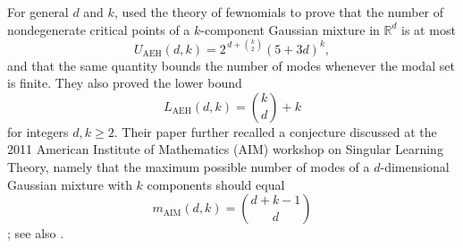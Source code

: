 \documentclass[11pt]{article}
\theoremstyle{plain}
\theoremstyle{definition}
\theoremstyle{remark}
\numberwithin{equation}{section}
\newcommand{\R}{\mathbb{R}}
\begin{document}
For general $d$ and $k$, \citet{AmendolaEngstromHaase2019} used the theory of fewnomials \citep{Khovanskii1991} to prove that the number of nondegenerate critical points of a $k$-component Gaussian mixture in $\R^d$ is at most
\[
U_{\mathrm{AEH}}(d,k)=2^{\,d+\binom{k}{2}}(5+3d)^k,
\]
and that the same quantity bounds the number of modes whenever the modal set is finite. They also proved the lower bound
\[
L_{\mathrm{AEH}}(d,k)=\binom{k}{d}+k
\]
for integers $d,k\ge 2$. Their paper further recalled a conjecture discussed at the 2011 American Institute of Mathematics (AIM) workshop on Singular Learning Theory, namely that the maximum possible number of modes of a $d$-dimensional Gaussian mixture with $k$ components should equal
\[
m_{\mathrm{AIM}}(d,k)=\binom{d+k-1}{d}
\]
\citep[Conjecture~3.1]{AmendolaEngstromHaase2019}; see also \citet{SteeleSturmfelsWatanabe2011}.
\end{document}
